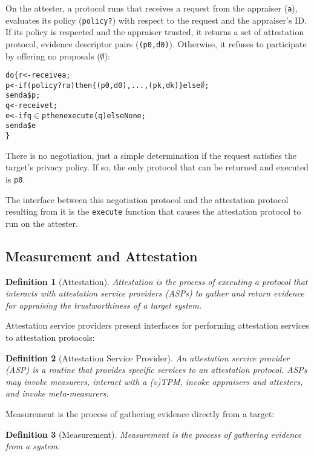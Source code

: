 \documentclass[10pt]{article}
\newtheorem{definition}{Definition}
\begin{document}
On the attester, a protocol runs that receives a request from the
appraiser (\Verb+a+), evaluates its policy (\Verb+policy?+) with
respect to the request and the appraiser's ID.  If its policy is
respected and the appraiser trusted, it returns a set of attestation
protocol, evidence descriptor pairs (\Verb+(p0,d0)+).  Otherwise, it
refuses to participate by offering no proposals ($\emptyset$):

\begin{alltt}
  do \{ r <- receive a;
       p <- if (policy? r a) then \{(p0,d0),...,(pk,dk)\} else \(\emptyset\);
       send a \$ p;
       q <- receive t;
       e <- if q \(\in\) p then execute(q) else None;
       send a \$ e
  \}
\end{alltt}

There is no negotiation, just a simple determination if the request
satisfies the target's privacy policy.  If so, the only protocol that
can be returned and executed is \Verb+p0+.

The interface between this negotiation protocol and the attestation
protocol resulting from it is the \Verb+execute+ function that causes
the attestation protocol to run on the attester.

\subsection*{Measurement and Attestation}

\begin{definition}[Attestation]
  Attestation is the process of executing a protocol that interacts
  with attestation service providers (ASPs) to gather and return evidence for
  appraising the trustworthiness of a target system.
\end{definition}

Attestation service providers present interfaces for performing
attestation services to attestation protocols:

\begin{definition}[Attestation Service Provider]
  An attestation service provider (ASP) is a routine that provides
  specific services to an attestation protocol.  ASPs may invoke
  measurers, interact with a (v)TPM, invoke appraisers and attesters,
  and invoke meta-measurers.
\end{definition}

Measurement is the process of gathering evidence directly from a target:

\begin{definition}[Measurement]
  Measurement is the process of gathering evidence from a system.
\end{definition}
\end{document}
